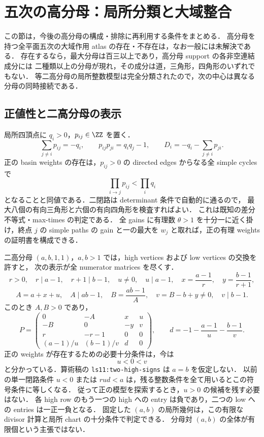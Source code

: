 \section{五次の高分母：局所分類と大域整合}
\label{nt10:denominators}

この節は，今後の高分母の構成・排除に再利用する条件をまとめる．
高分母を持つ全平面五次の大域作用 atlas の存在・不存在は，なお一般には未解決である．
存在するなら，最大分母は百三以上であり，高分母 support の各非空連結成分には
二種類以上の分母が現れ，その成分は道，三角形，四角形のいずれでもない．
等二高分母の局所整数模型は完全分類されたので，次の中心は異なる分母の同時接続である．

\subsection{正値性と二高分母の表示}

局所四頂点に $q_i>0$，$p_{ij}\in\ZZ$ を置く．
\[
 \sum_{j\ne i}p_{ij}=-q_i,\qquad
 p_{ij}p_{ji}=q_iq_j-1,\qquad
 D_i=-q_i-\sum_{j\ne i}p_{ji}.
\]
正の basin weights の存在は，$p_{ij}>0$ の directed edges からなる全 simple cycles で
\[
 \prod_{i\to j}p_{ij}<\prod_iq_i
\]
となることと同値である．二閉路は determinant 条件で自動的に通るので，
最大八個の有向三角形と六個の有向四角形を検査すればよい．
これは既知の差分不等式・max-times の判定\cite[\S2]{SergeevSchneiderButkovic}である．
全 gains に有理数 $\theta>1$ を十分一に近く掛け，終点 $j$ の simple paths の gain と一の最大を
$w_j$ と取れば，正の有理 weights の証明書を構成できる．

二高分母 $(a,b,1,1)$，$a,b>1$ では，high vertices および low vertices の交換を許すと，
次の表示が全 numerator matrices を尽くす．
\[
 r>0,\quad r\mid a-1,\quad r+1\mid b-1,\quad
 u\ne0,\quad u\mid a-1,\quad
 x=\frac{a-1}{r},\quad y=\frac{b-1}{r+1},
\]
\[
 A=a+x+u,\quad A\mid ab-1,\quad
 B=\frac{ab-1}{A},\quad v=B-b+y\ne0,\quad v\mid b-1.
\]
このとき $A,B>0$ であり，
\[
 P=\begin{pmatrix}
 0&-A&x&u\\
 -B&0&-y&v\\
 r&-r-1&0&0\\
 (a-1)/u&(b-1)/v&d&0
 \end{pmatrix},\qquad
 d=-1-\frac{a-1}{u}-\frac{b-1}{v}.
\]
正の weights が存在するための必要十分条件は，今は
\[
 u<0<v
\]
と分かっている．算術稿の \texttt{ls11:two-high-signs} は $a=b$ を仮定しない．
以前の単一閉路条件 $u<0$ または $rud<a$ は，残る整数条件を全て用いるとこの符号条件に等しくなる．
従って正の模型を探索するとき，$u>0$ の候補を残す必要はない．
各 high row のもう一つの high への entry は負であり，二つの low への entries は一正一負となる．
固定した $(a,b)$ の局所幾何は，この有限な divisor 計算と局所 chart の十分条件で判定できる．
分母対 $(a,b)$ の全体が有限個という主張ではない．


